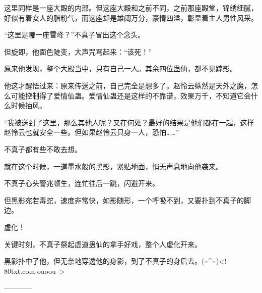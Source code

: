 \begin{this_body}
这里同样是一座大殿的内部。但这座大殿和之前不同，之前那座殿堂，锦绣细腻，好似有着女人的脂粉气，而这座却是雄阔万分，豪情四溢，彰显着主人男性风采。

“这里是哪一座雪峰？”不真子冒出这个念头。

但旋即，他面色陡变，大声咒骂起来：“该死！”

原来他发现，整个大殿当中，只有自己一人。其余四位蛊仙，都不见踪影。

他这才醒悟过来：原来传送之前，自己完全是想多了。赵怜云纵然是天外之魔，怎么可能控制得了爱情仙蛊。爱情仙蛊还是这样的不靠谱，效果万千，不知道它会什么时候抽风。

“我被送到了这里，那么其他人呢？又在何处？最好的结果是他们都在一起，这样赵怜云也就安全一些。但如果赵怜云只身一人，恐怕……”

不真子都有些不敢去想。

就在这个时候，一道墨水般的黑影，紧贴地面，悄无声息地向他袭来。

不真子心头警兆顿生，连忙往后一跳，闪避开来。

但黑影宛若毒蛇，速度非常快，如影随形，一个呼吸不到，又要扑到不真子的脚边。

虚化！

关键时刻，不真子祭起虚道蛊仙的拿手好戏，整个人虚化开来。

黑影扑中了他，但无奈地穿透他的身影，到了不真子的身后去。(\~{}\^{}\~{})<!--80txt.com-ouoou-->

------------

\end{this_body}

